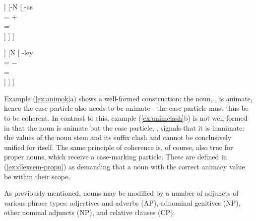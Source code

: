 \ex{}%
\begin{minipage}[t]{.5\linewidth}
\tl\label{ex:animok}\quad %
\begin{forest}
[{%
\xhead{N} \\
\ups{\Anim} = $+$ \\
\ups{\Case} = \Parg{}
}
	[N\tsub{stem}
		[{%
			gan \\
			\ups{\Anim} = $+$ \\
		}]
	]
	[-N
		[{%
			-as \\
			\ups{\Anim} = $+$ \\
			\ups{\Case} = \Parg{} \\
		}]
	]
]
\end{forest}
\end{minipage}
\begin{minipage}[t]{.5\linewidth}
\tl\label{ex:animclash}\quad %
\ljudge*\begin{forest}
[{%
\xhead{N} \\
\ups{\Anim} = \err{} \\
\ups{\Case} = \Parg{}
}
	[N\tsub{stem}
		[{%
			gan \\
			\ups{\Anim} = $+$ \\
		}]
	]
	[N
		[{%
			-ley \\
			\ups{\Anim} = $-$ \\
			\ups{\Case} = \Parg{} \\
		}]
	]
]
\end{forest}
\end{minipage}
\xe

Example (\ref{ex:animok}a) shows a well-formed construction: the noun, 
, is animate, hence the case particle also needs to be 
animate---the case particle must thus be  to be coherent. In 
contrast to this, example (\ref{ex:animclash}b) is not well-formed in that the 
noun is animate but the case particle, , signals that 
it is inanimate: the \Anim{} values of the noun stem and its suffix 
clash and cannot be conclusively unified for  itself. The 
same principle of coherence is, of course, also true for proper nouns, which 
receive a case-marking particle. These are defined in (\ref{ex:dlexsem-propn}) 
as demanding that a noun with the correct animacy value be within their scope.

As previously mentioned, nouns may be modified by a number of adjuncts of
various phrase types: adjectives and adverbs (AP), adnominal genitives (NP), 
other nominal adjuncts (NP), and relative clauses (CP):

